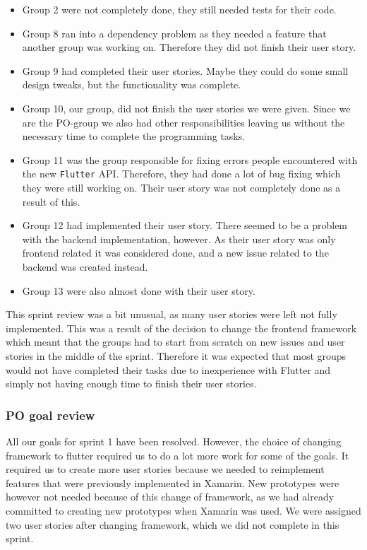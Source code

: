 \begin{itemize}
    \item Group 2 were not completely done, they still needed tests for their code.
    \item Group 8 ran into a dependency problem as they needed a feature that another group was working on. Therefore they did not finish their user story.
    \item Group 9 had completed their user stories. Maybe they could do some small design tweaks, but the functionality was complete.
    \item Group 10, our group, did not finish the user stories we were given. Since we are the PO-group we also had other responsibilities leaving us without the necessary time to complete the programming tasks.
    \item Group 11 was the group responsible for fixing errors people encountered with the new \texttt{Flutter} API. Therefore, they had done a lot of bug fixing which they were still working on. Their user story was not completely done as a result of this.
    \item Group 12 had implemented their user story. There seemed to be a problem with the backend implementation, however. As their user story was only frontend related it was considered done, and a new issue related to the backend was created instead.
    \item Group 13 were also almost done with their user story.
\end{itemize}
\noindent
This sprint review was a bit unusual, as many user stories were left not fully implemented. This was a result of the decision to change the frontend framework which meant that the groups had to start from scratch on new issues and user stories in the middle of the sprint.
Therefore it was expected that most groups would not have completed their tasks due to inexperience with Flutter and simply not having enough time to finish their user stories.

\subsubsection{PO goal review}
All our goals for sprint 1 have been resolved. 
However, the choice of changing framework to flutter required us to do a lot more work for some of the goals.
It required us to create more user stories because we needed to reimplement features that were previously implemented in Xamarin.
New prototypes were however not needed because of this change of framework, as we had already committed to creating new prototypes when Xamarin was used.
We were assigned two user stories after changing framework, which we did not complete in this sprint.


